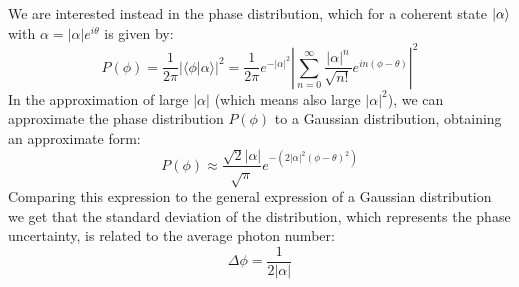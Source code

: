 \documentclass[prl, 11 pt]{revtex4-2}
\begin{document}
We are interested instead in the phase distribution, which for a coherent state $\ket{\alpha}$ with $\alpha = |\alpha|e^{i\theta}$ is given by:
%
\begin{equation}
    P(\phi) = \frac{1}{2\pi} |\langle \phi|\alpha \rangle|^2= \frac{1}{2\pi} e^{-|\alpha|^2} \left|\sum_{n=0}^{\infty} \frac{|\alpha|^n}{\sqrt{n!}} e^{in(\phi-\theta)} \right|^2
\end{equation}
%
In the approximation of large $|\alpha|$ (which means also large $|\alpha|^2$), we can approximate the phase distribution $P(\phi)$ to a Gaussian distribution, obtaining an approximate form:
%
\begin{equation}
    \label{eq:p_phi}
    P(\phi) \approx \frac{\sqrt{2}|\alpha|}{\sqrt{\pi}} e^{-(2|\alpha|^2(\phi - \theta)^2)}
\end{equation}
%
Comparing this expression to the general expression of a Gaussian distribution we get that the standard deviation of the distribution, which represents the phase uncertainty, is related to the average photon number:
%
\begin{equation}
    \label{eq:delta_phi}
    \Delta\phi = \frac{1}{2|\alpha|}
\end{equation}
\end{document}
